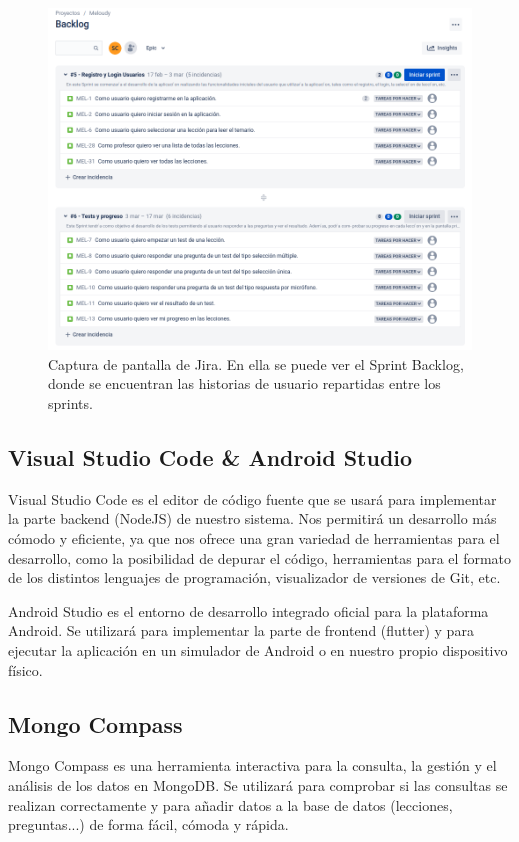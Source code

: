 \begin{figure}[H]
  \centering
  \includegraphics[width=\textwidth]{imagenes/c7/jira.png}
  \caption{Captura de pantalla de Jira. En ella se puede ver el Sprint Backlog, donde se encuentran las historias de usuario repartidas entre los sprints.}
  \label{fig:login}
\end{figure}


\subsection{Visual Studio Code \& Android Studio}
Visual Studio Code es el editor de código fuente que se usará para implementar la parte backend (NodeJS) de nuestro sistema. Nos permitirá un desarrollo más cómodo y eficiente, ya que nos ofrece una gran variedad de herramientas para el desarrollo, como la posibilidad de depurar el código, herramientas para el formato de los distintos lenguajes de programación, visualizador de versiones de Git, etc.

Android Studio es el entorno de desarrollo integrado oficial para la plataforma Android. Se utilizará para implementar la parte de frontend (flutter) y para ejecutar la aplicación en un simulador de Android o en nuestro propio dispositivo físico.

\subsection{Mongo Compass}
Mongo Compass es una herramienta interactiva para la consulta, la gestión y el análisis de los datos en MongoDB. Se utilizará para comprobar si las consultas se realizan correctamente y para añadir datos a la base de datos (lecciones, preguntas...) de forma fácil, cómoda y rápida.

